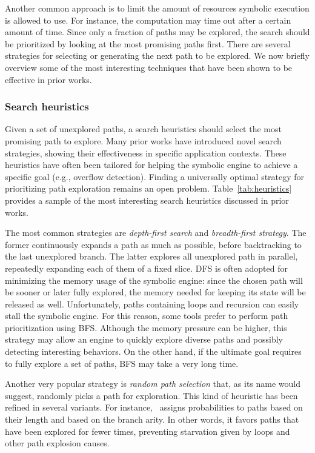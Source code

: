 Another common approach is to limit the amount of resources symbolic execution is allowed to use. For instance, the computation may time out after a certain amount of time. Since only a fraction of paths may be explored, the search should be prioritized by looking at the most promising paths first. There are several strategies for selecting or generating the next path to be explored. We now briefly overview some of the most interesting techniques that have been shown to be effective in prior works.

\subsubsection{Search heuristics}

Given a set of unexplored paths, a search heuristics should select the most promising path to explore. Many prior works have introduced novel search strategies, showing their effectiveness in specific application contexts. These heuristics have often been tailored for helping the symbolic engine to achieve a specific goal (e.g., overflow detection). Finding a universally optimal strategy for prioritizing path exploration remains an open problem. Table~\ref{tab:heuristics} provides a sample of the most interesting search heuristics discussed in prior works. 

The most common strategies are {\em depth-first search} and {\em breadth-first strategy}. The former continuously expands a path as much as possible, before backtracking to the last unexplored branch. The latter explores all unexplored path in parallel, repeatedly expanding each of them of a fixed slice. DFS is often adopted for minimizing the memory usage of the symbolic engine: since the chosen path will be sooner or later fully explored, the memory needed for keeping its state will be released as well. Unfortunately, paths containing loops and recursion can easily stall the symbolic engine. For this reason, some tools prefer to perform path prioritization using BFS. Although the memory pressure can be higher, this strategy may allow an engine to quickly explore diverse paths and possibly detecting interesting behaviors. On the other hand, if the ultimate goal requires to fully explore a set of paths, BFS may take a very long time.

Another very popular strategy is {\em random path selection} that, as its name would suggest, randomly picks a path for exploration. This kind of heuristic has been refined in several variants. For instance,~\cite{KLEE-OSDI08} assigns probabilities to paths based on their length and based on the branch arity. In other words, it favors paths that have been explored for fewer times, preventing starvation given by loops and other path explosion causes.

